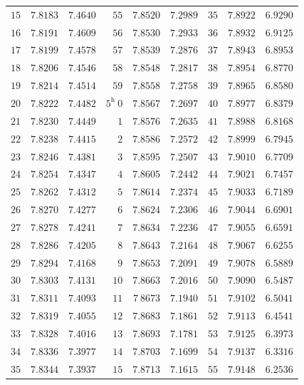 \begin{center}
{{\begin{minipage}{.83\linewidth}
\begin{tabular}{r|r|r||r|r|r||r|r|r}
$15$ & $7.8183$ & $7.4640$ & $55$ & $7.8520$ & $7.2989$ & $35$ & $7.8922$ & $6.9290$\\[1.15pt]
$16$ & $7.8191$ & $7.4609$ & $56$ & $7.8530$ & $7.2933$ & $36$ & $7.8932$ & $6.9125$\\
$17$ & $7.8199$ & $7.4578$ & $57$ & $7.8539$ & $7.2876$ & $37$ & $7.8943$ & $6.8953$\\
$18$ & $7.8206$ & $7.4546$ & $58$ & $7.8548$ & $7.2817$ & $38$ & $7.8954$ & $6.8770$\\
$19$ & $7.8214$ & $7.4514$ & $59$ & $7.8558$ & $7.2758$ & $39$ & $7.8965$ & $6.8580$\\
$20$ & $7.8222$ & $7.4482$ & $5^{\mathrm h}\ 0$ & $7.8567$ & $7.2697$ & $40$ & $7.8977$ & $6.8379$\\[1.15pt]
$21$ & $7.8230$ & $7.4449$ & $1$ & $7.8576$ & $7.2635$ & $41$ & $7.8988$ & $6.8168$\\
$22$ & $7.8238$ & $7.4415$ & $2$ & $7.8586$ & $7.2572$ & $42$ & $7.8999$ & $6.7945$\\
$23$ & $7.8246$ & $7.4381$ & $3$ & $7.8595$ & $7.2507$ & $43$ & $7.9010$ & $6.7709$\\
$24$ & $7.8254$ & $7.4347$ & $4$ & $7.8605$ & $7.2442$ & $44$ & $7.9021$ & $6.7457$\\
$25$ & $7.8262$ & $7.4312$ & $5$ & $7.8614$ & $7.2374$ & $45$ & $7.9033$ & $6.7189$\\[1.15pt]
$26$ & $7.8270$ & $7.4277$ & $6$ & $7.8624$ & $7.2306$ & $46$ & $7.9044$ & $6.6901$\\
$27$ & $7.8278$ & $7.4241$ & $7$ & $7.8634$ & $7.2236$ & $47$ & $7.9055$ & $6.6591$\\
$28$ & $7.8286$ & $7.4205$ & $8$ & $7.8643$ & $7.2164$ & $48$ & $7.9067$ & $6.6255$\\
$29$ & $7.8294$ & $7.4168$ & $9$ & $7.8653$ & $7.2091$ & $49$ & $7.9078$ & $6.5889$\\
$30$ & $7.8303$ & $7.4131$ & $10$ & $7.8663$ & $7.2016$ & $50$ & $7.9090$ & $6.5487$\\[1.15pt]
$31$ & $7.8311$ & $7.4093$ & $11$ & $7\ 8673$ & $7.1940$ & $51$ & $7.9102$ & $6.5041$\\
$32$ & $7.8319$ & $7.4055$ & $12$ & $7.8683$ & $7.1861$ & $52$ & $7.9113$ & $6.4541$\\
$33$ & $7.8328$ & $7.4016$ & $13$ & $7.8693$ & $7.1781$ & $53$ & $7.9125$ & $6.3973$\\
$34$ & $7.8336$ & $7.3977$ & $14$ & $7.8703$ & $7.1699$ & $54$ & $7.9137$ & $6.3316$\\
$35$ & $7.8344$ & $7.3937$ & $15$ & $7.8713$ & $7.1615$ & $55$ & $7.9148$ & $6.2536$\\[1.15pt]

\end{tabular}
\end{minipage}}}
\end{center}
